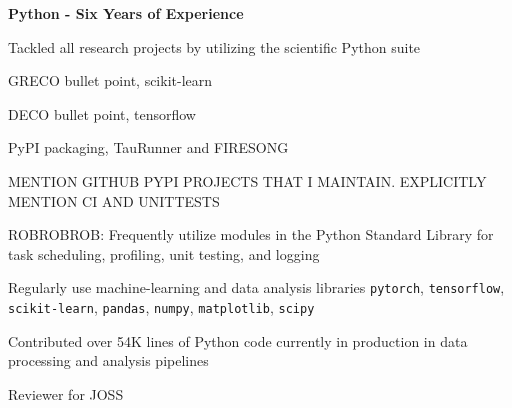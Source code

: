 
\vspace{-0.4cm}

\begin{cventries}
  \cventry
    {\textbf{Python - Six Years of Experience}} %
    {} %
    {} %
    {} %
    {
    \begin{cvitems}
    \vspace{-0.1cm}
    \item{Tackled all research projects by utilizing the scientific Python suite}
    \item{GRECO bullet point, scikit-learn}
    \item{DECO bullet point, tensorflow}
    \item{PyPI packaging, TauRunner and FIRESONG}
    \item{MENTION GITHUB PYPI PROJECTS THAT I MAINTAIN. EXPLICITLY MENTION CI AND UNITTESTS}
    \item {ROBROBROB: Frequently utilize modules in the Python Standard Library for task scheduling, profiling, unit testing, and logging}
        \item {Regularly use machine-learning and data analysis libraries \texttt{pytorch}, \texttt{tensorflow}, \texttt{scikit-learn}, \texttt{pandas}, \texttt{numpy}, \texttt{matplotlib}, \texttt{scipy}}
        \item {Contributed over 54K lines of Python code currently in production in data processing and analysis pipelines}
        \item{Reviewer for JOSS}
    \end{cvitems}
    }

\end{cventries}


